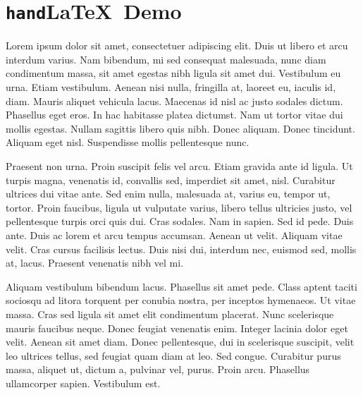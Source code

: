 \documentclass{article}
\begin{document}
\thispagestyle{empty}

\section*{\texttt{hand}\LaTeX\ Demo}

\vfill

\begin{handpar}
Lorem ipsum dolor sit amet, consectetuer adipiscing elit. Duis ut libero et arcu
interdum varius. Nam bibendum, mi sed consequat malesuada, nunc diam condimentum
massa, sit amet egestas nibh ligula sit amet dui. Vestibulum eu urna. Etiam
vestibulum. Aenean nisi nulla, fringilla at, laoreet eu, iaculis id,
diam. Mauris aliquet vehicula lacus. Maecenas id nisl ac justo sodales
dictum. Phasellus eget eros. In hac habitasse platea dictumst. Nam ut tortor
vitae dui mollis egestas. Nullam sagittis libero quis nibh. Donec aliquam. Donec
tincidunt. Aliquam eget nisl. Suspendisse mollis pellentesque nunc.
\end{handpar}

\begin{handpar}
Praesent non urna. Proin suscipit felis vel arcu. Etiam gravida ante id
ligula. Ut turpis magna, venenatis id, convallis sed, imperdiet sit amet,
nisl. Curabitur ultrices dui vitae ante. Sed enim nulla, malesuada at, varius
eu, tempor ut, tortor. Proin faucibus, ligula ut vulputate varius, libero tellus
ultricies justo, vel pellentesque turpis orci quis dui. Cras sodales. Nam in
sapien. Sed id pede. Duis ante. Duis ac lorem et arcu tempus accumsan. Aenean ut
velit. Aliquam vitae velit. Cras cursus facilisis lectus. Duis nisi dui,
interdum nec, euismod sed, mollis at, lacus. Praesent venenatis nibh vel mi.
\end{handpar}

\begin{handpar}
Aliquam vestibulum bibendum lacus. Phasellus sit amet pede. Class aptent taciti
sociosqu ad litora torquent per conubia nostra, per inceptos hymenaeos. Ut vitae
massa. Cras sed ligula sit amet elit condimentum placerat. Nunc scelerisque
mauris faucibus neque. Donec feugiat venenatis enim. Integer lacinia dolor eget
velit. Aenean sit amet diam. Donec pellentesque, dui in scelerisque suscipit,
velit leo ultrices tellus, sed feugiat quam diam at leo. Sed congue. Curabitur
purus massa, aliquet ut, dictum a, pulvinar vel, purus. Proin arcu. Phasellus
ullamcorper sapien. Vestibulum est.
\end{handpar}
\end{document}
